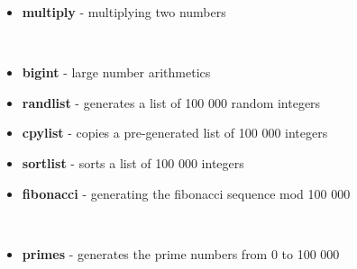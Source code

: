 \begin{itemize}
\tightlist
\item
  \textbf{multiply} - multiplying two numbers
\end{itemize}

\begin{Shaded}
\begin{Highlighting}[]
\OperatorTok{=}\NormalTok{):}
    \NormalTok{ \_ }
         \OperatorTok{*} 
\end{Highlighting}
\end{Shaded}

\begin{itemize}
\tightlist
\item
  \textbf{bigint} - large number arithmetics
\item
  \textbf{randlist} - generates a list of 100 000 random integers
\item
  \textbf{cpylist} - copies a pre-generated list of 100 000 integers
\item
  \textbf{sortlist} - sorts a list of 100 000 integers
\item
  \textbf{fibonacci} - generating the fibonacci sequence mod 100 000
\end{itemize}

\begin{Shaded}
\begin{Highlighting}[]
\OperatorTok{=}\NormalTok{):}
    \OperatorTok{\textless{}} \NormalTok{:}
\OperatorTok{=} \NormalTok{, }
    \NormalTok{ \_ }
\OperatorTok{=}\OperatorTok{+}\OperatorTok{\%} 
\end{Highlighting}
\end{Shaded}

\begin{itemize}
\tightlist
\item
  \textbf{primes} - generates the prime numbers from 0 to 100 000
\end{itemize}


